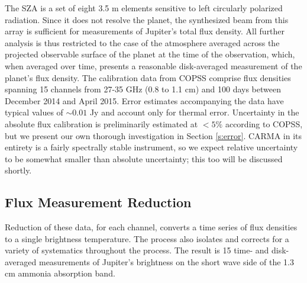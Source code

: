 \documentclass{article}
\begin{document}
	The SZA is a set of eight 3.5 m elements sensitive to left circularly polarized radiation.
	Since it does not resolve the planet, the synthesized beam from this array is sufficient for measurements of Jupiter's total flux density.
	All further analysis is thus restricted to the case of the atmosphere averaged across the projected observable surface of the planet at the time of the observation, which, when averaged over time, presents a reasonable disk-averaged measurement of the planet's flux density.
	The calibration data from COPSS comprise flux densities spanning 15 channels from 27-35 GHz (0.8 to 1.1 cm) and 100 days between December 2014 and April 2015.
	Error estimates accompanying the data have typical values of $\sim0.01$ Jy and account only for thermal error.
	Uncertainty in the absolute flux calibration is preliminarily estimated at $<5\%$ according to COPSS, but we present our own thorough investigation in Section \ref{s:error}.
	CARMA in its entirety is a fairly spectrally stable instrument, so we expect relative uncertainty to be somewhat smaller than absolute uncertainty; this too will be discussed shortly.

\subsection{Flux Measurement Reduction}

	Reduction of these data, for each channel, converts a time series of flux densities to a single brightness temperature.
	The process also isolates and corrects for a variety of systematics throughout the process.
	The result is 15 time- and disk-averaged measurements of Jupiter's brightness on the short wave side of the 1.3 cm ammonia absorption band.
\end{document}
